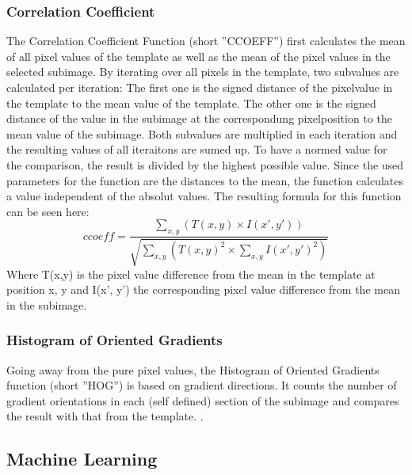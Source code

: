 \subsubsection{Correlation Coefficient}
The Correlation Coefficient Function (short ''CCOEFF'') first calculates the mean of all pixel values of the template as well as the mean of the pixel values in the selected subimage.
By iterating over all pixels in the template, two subvalues are calculated per iteration:
The first one is the signed distance of the pixelvalue in the template to the mean value of the template.
The other one is the signed distance of the value in the subimage at the correspondung pixelposition to the mean value of the subimage.
Both subvalues are multiplied in each iteration and the resulting values of all iteraitons are sumed up.
To have a normed value for the comparison, the result is divided by the highest possible value.
Since the used parameters for the function are the distances to the mean, the function calculates a value independent of the absolut values.
The resulting formula for this function can be seen here:
\[ccoeff = \frac{\sum_{x,y} (T(x,y) \times I(x',y'))}{\sqrt{\sum_{x,y} (T(x,y)^2 \times \sum_{x,y} I(x',y')^2)}} \]
Where T(x,y) is the pixel value difference from the mean in the template at position x, y and I(x', y') the corresponding pixel value difference from the mean in the subimage.
\subsubsection{Histogram of Oriented Gradients}
Going away from the pure pixel values, the Histogram of Oriented Gradients function (short ''HOG'') is based on gradient directions.
It counts the number of gradient orientations in each (self defined) section of the subimage and compares the result with that from the template.
\cite{hog_function}.

\subsection{Machine Learning}
